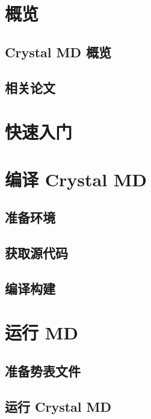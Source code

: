 
\chapter{概览}
\section{Crystal MD 概览}

\section{相关论文}


\chapter{快速入门}
\section{}


\chapter{编译 Crystal MD}
\section{准备环境}

\section{获取源代码}

\section{编译构建}


\chapter{运行 MD}
\section{准备势表文件}

\section{运行 Crystal MD}


